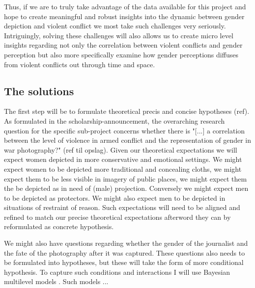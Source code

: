 \documentclass[a4paper]{article}
\begin{document}
Thus, if we are to truly take advantage of the data available for this project and hope to create meaningful and robust insights into the dynamic between gender depiction and violent conflict we most take such challenges very seriously. Intriguingly, solving these challenges will also allows us to create micro level insights regarding not only the correlation between violent conflicts and gender perception but also more specifically examine how gender perceptions diffuses from violent conflicts out through time and space.\par


\subsection{The solutions}

The first step will be to formulate theoretical precis and concise hypotheses (ref). As formulated in the scholarship-announcement, the overarching research question for the specific sub-project concerns whether there is "[...] a correlation between the level of violence in armed conflict and the representation of gender in war photography?" (ref til opslag). Given our theoretical expectations we will expect women depicted in more conservative and emotional settings. We might expect women to be depicted more traditional and concealing cloths, we might expect them to be less visible in imagery of public places, we might expect them the be depicted as in need of (male) projection. Conversely we might expect men to be depicted as protectors. We might also expect men to be depicted in situations of restraint of reason. Such expectations will need to be aligned and refined to match our precise theoretical expectations afterword they can by reformulated as concrete hypothesis.\par 

We might also have questions regarding whether the gender of the journalist and the fate of the photography after it was captured. These questions also needs to be formulated into hypotheses, but these will take the form of more conditional hypothesis. To capture such conditions and interactions I will use Bayesian multilevel models \citep{Gelman_2006, Gelman_2013, Mcelreath_2018}. Such models ...\par
\end{document}
